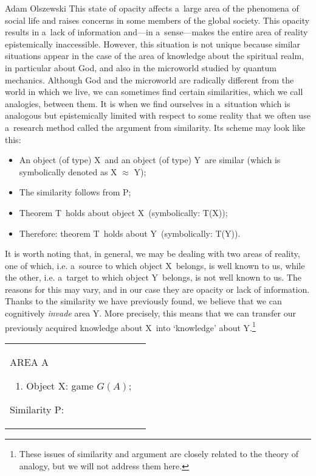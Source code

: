 \begin{artengenv}{Adam Olszewski}
This state of opacity affects a~large area of the phenomena of social life and raises concerns in some members of the global society. This opacity results in a~lack of information and---in a~sense---makes the entire area of reality epistemically inaccessible. However, this situation is not unique because similar situations appear in the case of the area of knowledge about the spiritual realm, in particular about God, and also in the microworld studied by quantum mechanics. Although God and the microworld are radically different from the world in which we live, we can sometimes find certain similarities, which we call analogies, between them. It is when we find ourselves in a~situation which is analogous but epistemically limited with respect to some reality that we often use a~research method called the argument from similarity. Its scheme may look like this:
\begin{itemize}
\item An object (of type) X~and an object (of type) Y~are similar (which is symbolically denoted as X $\approx$ Y);
\item The similarity follows from P;
\item Theorem T~holds about object X~(symbolically: T(X));
\item Therefore: theorem T~holds about Y~(symbolically: T(Y)).
\end{itemize}
It is worth noting that, in general, we may be dealing with two areas of reality, one of which, i.e. a~source to which object X~belongs, is well known to us, while the other, i.e. a~target to which object Y~belongs, is not well known to us. The reasons for this may vary, and in our case they are opacity or lack of information. Thanks to the similarity we have previously found, we believe that we can cognitively \textit{invade} area Y. More precisely, this means that we can transfer our previously acquired knowledge about X~into ‘knowledge' about Y.\footnote{These issues of similarity and argument are closely related to the theory of analogy, but we will not address them here.}





\begin{table}[H]
\begin{small}
\begin{tabular}{|p{}|p{}|}%
\hline%
AREA A

\begin{enumerate}[wide, labelwidth=!, labelindent=0pt]
\item Object X: game $G(A)$;
\end{enumerate}
Similarity P:


\end{tabular}
\end{small}
\end{table}
\end{artengenv}
